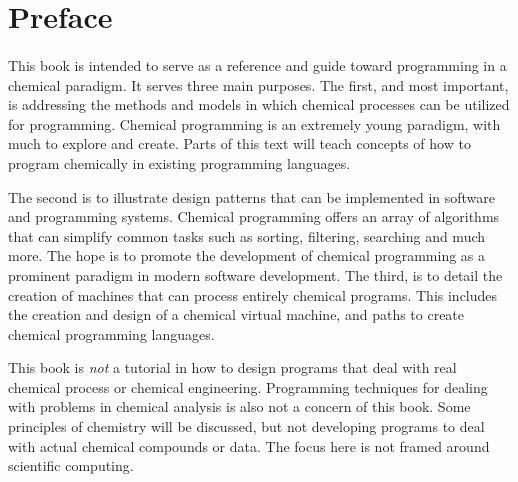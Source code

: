 
\section{Preface}
\paragraph{   } This book is intended to serve as a reference and guide toward programming in a chemical paradigm.  It serves three main purposes. The first, and most important, is addressing the methods and models in which chemical processes can be utilized for programming. Chemical programming is an extremely young paradigm, with much to explore and create. Parts of this text will teach concepts of how to program chemically in existing programming languages.
\par The second is to illustrate design patterns that can be implemented in software and programming systems. Chemical programming offers an array of algorithms that can simplify common tasks such as sorting, filtering, searching and much more. The hope is to promote the development of chemical programming as a prominent paradigm in modern software development.  The third, is to detail the creation of machines that can process entirely chemical programs. This includes the creation and design of a chemical virtual machine, and paths to create  chemical programming languages.
\par This book is \textit{not} a tutorial in how to design programs that deal with real chemical process or chemical engineering. Programming techniques for dealing with problems in chemical analysis is also not a concern of this book. Some principles of chemistry will be discussed, but not developing programs to deal with actual chemical compounds or data. The focus here is not framed around scientific computing.

\newpage